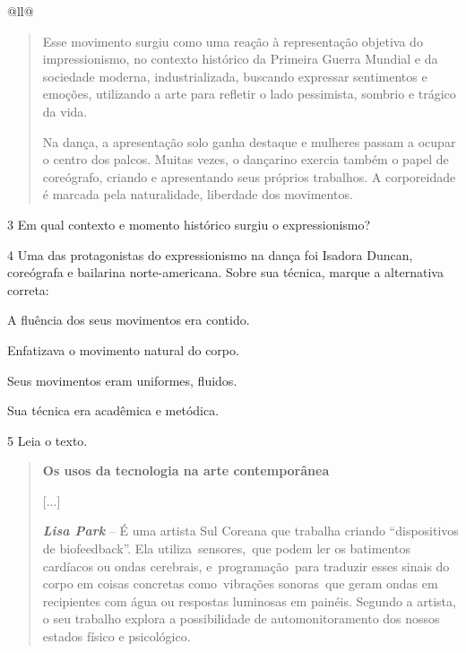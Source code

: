 \begin{itemize}
\begin{itemize}
\begin{escolha}[]{@{}ll@{}}
\begin{quote}
Esse movimento surgiu como uma reação à representação objetiva do
impressionismo, no contexto histórico da Primeira Guerra Mundial e da
sociedade moderna, industrializada, buscando expressar sentimentos e
emoções, utilizando a arte para refletir o lado pessimista, sombrio e
trágico da vida.

Na dança, a apresentação solo ganha destaque e mulheres passam a ocupar
o centro dos palcos. Muitas vezes, o dançarino exercia também o papel de
coreógrafo, criando e apresentando seus próprios trabalhos. A
corporeidade é marcada pela naturalidade, liberdade dos
movimentos.
\end{quote}

\num{3} Em qual contexto e momento histórico surgiu o expressionismo?


\num{4} Uma das protagonistas do expressionismo na dança foi Isadora Duncan,
coreógrafa e bailarina norte-americana. Sobre sua técnica, marque a
alternativa correta:

\begin{boxlist}
\item A fluência dos seus movimentos era contido.

\item Enfatizava o movimento natural do corpo. 

\item Seus movimentos eram uniformes, fluidos.

\item Sua técnica era acadêmica e metódica.
\end{boxlist}


\num{5} Leia o texto.

\begin{quote}
\textbf{Os usos da tecnologia na arte contemporânea}

{[}...{]}

\emph{\textbf{Lisa Park}} -- É uma artista Sul Coreana que trabalha
criando ``dispositivos de biofeedback''. Ela utiliza~sensores,~que podem
ler os batimentos cardíacos ou ondas cerebrais, e~programação~para
traduzir esses sinais do corpo em coisas concretas como~vibrações
sonoras~que geram ondas em recipientes com água ou respostas luminosas
em painéis. Segundo a artista, o seu trabalho explora a possibilidade de
automonitoramento dos nossos estados físico e psicológico.


\end{quote}
\end{escolha}
\end{itemize}
\end{itemize}
